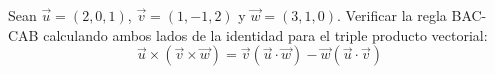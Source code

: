 Sean $\vec{u} = (2, 0, 1)$, $\vec{v} = (1, -1, 2)$ y $\vec{w} = (3, 1, 0)$. Verificar la regla BAC-CAB calculando ambos lados de la identidad para el triple producto vectorial:
\[ \vec{u} \times (\vec{v} \times \vec{w}) = \vec{v}(\vec{u} \cdot \vec{w}) - \vec{w}(\vec{u} \cdot \vec{v}) \]